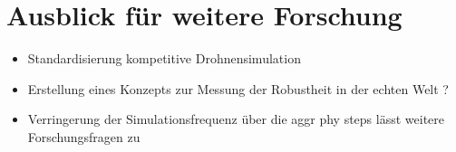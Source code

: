 \section{Ausblick für weitere Forschung}

\begin{itemize}
    \item Standardisierung kompetitive Drohnensimulation
    \item Erstellung eines Konzepts zur Messung der Robustheit in der echten Welt ?
    \item Verringerung der Simulationsfrequenz über die aggr phy steps lässt weitere Forschungsfragen zu
\end{itemize}